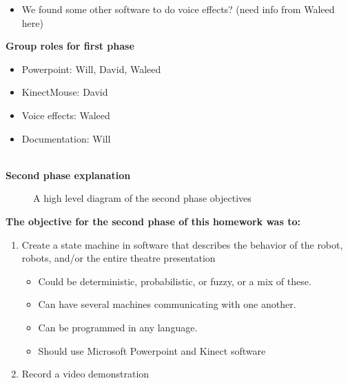 \documentclass[12pt]{article}
\begin{document}
\begin{description}
\begin{itemize}
\begin{itemize}
				\end{itemize}
			\item We found some other software to do voice effects? (need info from Waleed here)
		\end{itemize}
		\textbf{Group roles for first phase}
		\begin{itemize}
			\item Powerpoint: Will, David, Waleed
			\item KinectMouse: David
			\item Voice effects: Waleed
			\item Documentation: Will
		\end{itemize} \hfill \\
		\newpage
		\textbf{Second phase explanation}
		\begin{figure}[H]
			\centering
			\caption{A high level diagram of the second phase objectives}
		\end{figure}
		\textbf{The objective for the second phase of this homework was to:}
		\begin{enumerate}
			\item Create a state machine in software that describes the behavior of the robot, robots, and/or the entire theatre presentation
				\begin{itemize}
					\item Could be deterministic, probabilistic, or fuzzy, or a mix of these.
					\item Can have several machines communicating with one another.
					\item Can be programmed in any language.
					\item Should use Microsoft Powerpoint and Kinect software
				\end{itemize} 
			\item Record a video demonstration
		\end{enumerate}

\end{description}
\end{document}
